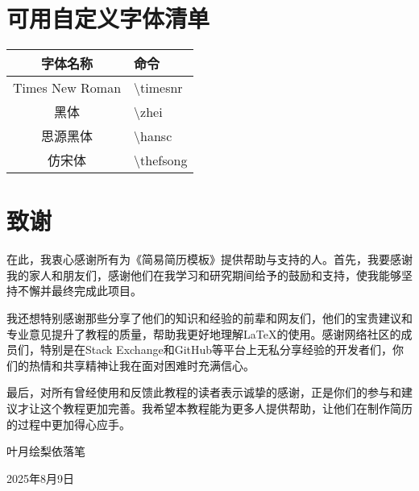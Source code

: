 \documentclass[a4paper,12pt]{ctexart}
\begin{document}
	\newpage
	\section{可用自定义字体清单}	
	\begin{table}[ht]
		\centering
		\renewcommand{\arraystretch}{1.2}
		\begin{tabularx}{\textwidth}{|c|>{\raggedright\arraybackslash}X|}
			\hline
			\textbf{字体名称}       & \textbf{命令}                        \\
			\hline
			Times New Roman        & \textbackslash timesnr \\
			\hline
			黑体                  & \textbackslash zhei\\
			\hline
			思源黑体              & \textbackslash hansc \\
			\hline
			仿宋体                & \textbackslash thefsong\\
			\hline
		\end{tabularx}
	\end{table}	
	
	\newpage
	\section{致谢}
	在此，我衷心感谢所有为《简易简历模板》提供帮助与支持的人。首先，我要感谢我的家人和朋友们，感谢他们在我学习和研究期间给予的鼓励和支持，使我能够坚持不懈并最终完成此项目。
	
	我还想特别感谢那些分享了他们的知识和经验的前辈和网友们，他们的宝贵建议和专业意见提升了教程的质量，帮助我更好地理解LaTeX的使用。感谢网络社区的成员们，特别是在Stack Exchange和GitHub等平台上无私分享经验的开发者们，你们的热情和共享精神让我在面对困难时充满信心。
	
	最后，对所有曾经使用和反馈此教程的读者表示诚挚的感谢，正是你们的参与和建议才让这个教程更加完善。我希望本教程能为更多人提供帮助，让他们在制作简历的过程中更加得心应手。
	
	\begin{flushright}
		叶月绘梨依\quad 落笔
		
		2025年8月9日
	\end{flushright} 
\end{document}
